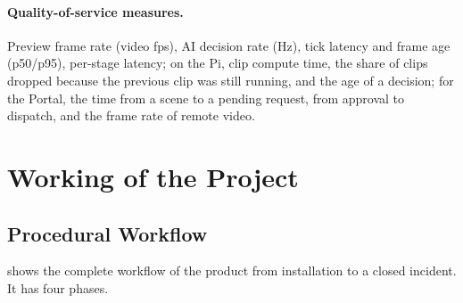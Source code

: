 \paragraph{Quality-of-service measures.} Preview frame rate (video fps), AI decision rate (Hz), tick latency and frame age (p50/p95), per-stage latency; on the Pi, clip compute time, the share of clips dropped because the previous clip was still running, and the age of a decision; for the Portal, the time from a scene to a pending request, from approval to dispatch, and the frame rate of remote video.

\section{Working of the Project}

\subsection{Procedural Workflow}
\label{sec:workflow}
 shows the complete workflow of the product from installation to a closed incident. It has four phases.

